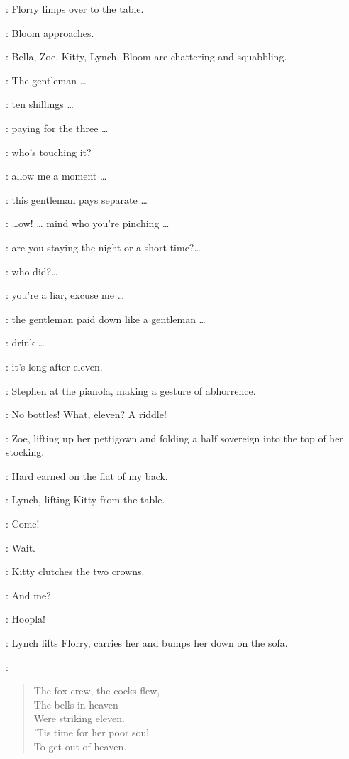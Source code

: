 :
Florry limps over to the table.

:
Bloom approaches.

:
Bella, Zoe, Kitty, Lynch, Bloom are chattering and squabbling.

\Zoe:
The gentleman \ldots

\Bella:
ten shillings \ldots

\Lynch:
paying for the three \ldots

\Kitty:
who's touching it?

\Bloom:
allow me a moment \ldots

\Zoe:
this gentleman pays separate \ldots

\Kitty:
\ldots ow! \ldots
mind who you're pinching \ldots

\Bella:
are you staying the night or a short time?\ldots

\Lynch:
who did?\ldots

\Kitty:
you're a liar, excuse me \ldots

\Zoe:
the gentleman paid down like a gentleman \ldots
{}

\Lynch:
drink \ldots

\Bella:
it's long after eleven.

:
Stephen at the pianola, making a gesture of abhorrence.

\Stephen:
No bottles!
What, eleven?
A riddle!

:
Zoe, lifting up her pettigown and folding a half sovereign
into the top of her stocking.

\Zoe:
Hard earned on the flat of my back.

:
Lynch, lifting Kitty from the table.

\Lynch:
Come!

\Kitty:
Wait.

:
Kitty clutches the two crowns.

\Florry:
And me?

\Lynch:
Hoopla!

:
Lynch lifts Florry, carries her and bumps her down on the sofa.

\Stephen:
\begin{verse}
    The fox crew, the cocks flew,\\
    The bells in heaven\\
    Were striking eleven.\\
%
    'Tis time for her poor soul\\
    To get out of heaven.
\end{verse}


